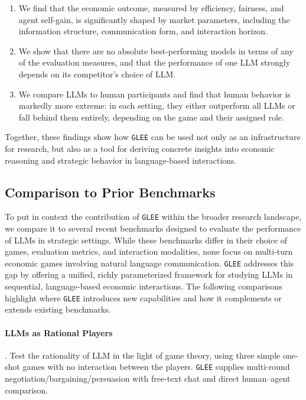 \begin{enumerate}
    \item We find that the economic outcome, measured by efficiency, fairness, and agent self-gain, is significantly shaped by market parameters, including the information structure, communication form, and interaction horizon.
    \item We show that there are no absolute best-performing models in terms of any of the evaluation measures, and that the performance of one LLM strongly depends on its competitor's choice of LLM.
    \item We compare LLMs to human participants and find that human behavior is markedly more extreme: in each setting, they either outperform all LLMs or fall behind them entirely, depending on the game and their assigned role.
\end{enumerate}
 
Together, these findings show how \texttt{GLEE} can be used not only as an infrastructure for research, but also as a tool for deriving concrete insights into economic reasoning and strategic behavior in language-based interactions.

\subsection{Comparison to Prior Benchmarks}
\label{app:prior_benchmarks}

To put in context the contribution of \texttt{GLEE} within the broader research landscape, we compare it to several recent benchmarks designed to evaluate the performance of LLMs in strategic settings. While these benchmarks differ in their choice of games, evaluation metrics, and interaction modalities, none focus on multi-turn economic games involving natural language communication. \texttt{GLEE} addresses this gap by offering a unified, richly parameterized framework for studying LLMs in sequential, language-based economic interactions. The following comparisons highlight where \texttt{GLEE} introduces new capabilities and how it complements or extends existing benchmarks.

\paragraph{LLMs as Rational Players} \cite{Fan2023CanLL}. Test the rationality of LLM in the light of game theory, using three simple one-shot games with no interaction between the players.
\texttt{GLEE} supplies multi-round negotiation/bargaining/persuasion with free-text chat and direct human–agent comparison.

